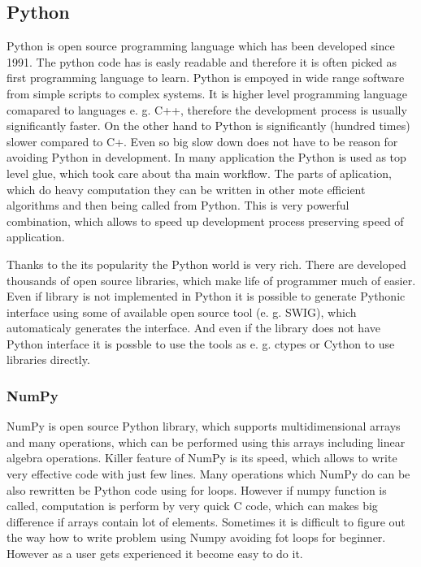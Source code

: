 \documentclass[a4paper,12pt]{report}
\begin{document}
\subsection{Python}

Python is open source programming language which has been developed since 1991. 
The python code has is easly readable and therefore it is often picked as first programming
language to learn. Python is empoyed in wide range software from simple scripts to complex systems.
It is higher level programming language comapared to languages e. g. C++, therefore 
the development process is usually significantly faster. On the other hand 
to Python is significantly (hundred times) slower compared to C+. Even so big 
slow down does not have to be reason for avoiding Python in development. 
In many application the Python is used as top level glue, which took care about 
tha main workflow. The parts of aplication, which do heavy computation  they can 
be written in other mote efficient algorithms and then being called 
from Python. This is very powerful combination, which allows to speed up development 
process preserving speed of application.

Thanks to the its popularity the Python world is very rich. There are developed
thousands of open source libraries, which make life of programmer much of easier. Even 
if library is not implemented in Python it is possible to generate Pythonic 
interface using some of available open source tool (e. g. SWIG), which automaticaly
generates the interface. And even if the library does not have Python interface it 
is possble to use the tools as e. g. ctypes or Cython to use libraries directly.


\subsubsection{NumPy}

NumPy is open source Python library, which supports multidimensional arrays and many operations, which can be
performed using this arrays including linear algebra operations. Killer feature of NumPy is its speed,
which allows to write very effective code with just few lines. Many operations which NumPy do can be 
also rewritten be Python code using  for loops. However if numpy function is called,
computation is perform by very quick C code, which can makes big difference if arrays contain 
lot of elements. Sometimes it is difficult to figure out the way how 
to write problem using Numpy avoiding fot loops  for beginner. However as a user gets experienced 
it become easy to do it. 
\end{document}
